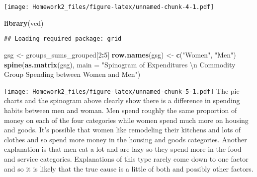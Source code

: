 \documentclass[]{article}
\newenvironment{Shaded}{\begin{snugshade}}{\end{snugshade}}
\newcommand{\KeywordTok}[1]{\textcolor[rgb]{0.13,0.29,0.53}{\textbf{#1}}}
\newcommand{\DataTypeTok}[1]{\textcolor[rgb]{0.13,0.29,0.53}{#1}}
\newcommand{\DecValTok}[1]{\textcolor[rgb]{0.00,0.00,0.81}{#1}}
\newcommand{\CharTok}[1]{\textcolor[rgb]{0.31,0.60,0.02}{#1}}
\newcommand{\StringTok}[1]{\textcolor[rgb]{0.31,0.60,0.02}{#1}}
\newcommand{\OperatorTok}[1]{\textcolor[rgb]{0.81,0.36,0.00}{\textbf{#1}}}
\newcommand{\NormalTok}[1]{#1}
\begin{document}
\begin{Shaded}
\end{Shaded}

\texttt{[image: Homework2\_files/figure-latex/unnamed-chunk-4-1.pdf]}

\begin{Shaded}
\begin{Highlighting}[]
\KeywordTok{library}\NormalTok{(vcd)}
\end{Highlighting}
\end{Shaded}

\begin{verbatim}
## Loading required package: grid
\end{verbatim}

\begin{Shaded}
\begin{Highlighting}[]
\NormalTok{gsg <-}\StringTok{ }\NormalTok{groups_sums_grouped[}\DecValTok{2}\OperatorTok{:}\DecValTok{5}\NormalTok{]}
\KeywordTok{row.names}\NormalTok{(gsg) <-}\StringTok{ }\KeywordTok{c}\NormalTok{(}\StringTok{"Women"}\NormalTok{, }\StringTok{"Men"}\NormalTok{)}
\KeywordTok{spine}\NormalTok{(}\KeywordTok{as.matrix}\NormalTok{(gsg), }\DataTypeTok{main =} \StringTok{"Spinogram of Expenditures }\CharTok{\textbackslash{}n}\StringTok{ Commodity Group Spending between Women and Men"}\NormalTok{)}
\end{Highlighting}
\end{Shaded}

\texttt{[image: Homework2\_files/figure-latex/unnamed-chunk-5-1.pdf]} The
pie charts and the spinogram above clearly show there is a difference in
spending habits between men and woman. Men spend roughly the same
proportion of money on each of the four categories while women spend
much more on housing and goods. It's possible that women like remodeling
their kitchens and lots of clothes and so spend more money in the
housing and goods categories. Another explanation is that men eat a lot
and are lazy so they spend more in the food and service categories.
Explanations of this type rarely come down to one factor and so it is
likely that the true cause is a little of both and possibly other
factors.
\end{document}
